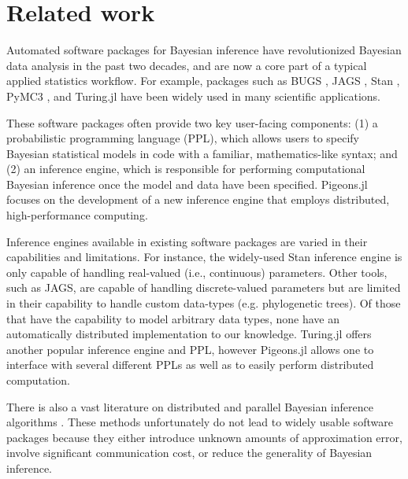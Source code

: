 \section{Related work}
Automated software packages for Bayesian inference have revolutionized Bayesian data 
analysis in the past two decades, and are now a core part of a typical applied statistics 
workflow. For example, packages such as BUGS 
\cite{lunn2013bugs, lunn2009bugs, lunn2000winbugs}, 
JAGS \cite{hornik2003jags}, Stan \cite{carpenter2017stan}, PyMC3 
\cite{salvatier2016probabilistic}, and Turing.jl \cite{ge2018turing} have been widely used in 
many scientific applications.

\medskip 
These software packages often provide two key user-facing components: (1) a 
probabilistic programming language (PPL), which allows users to specify Bayesian 
statistical models in code with a familiar, mathematics-like syntax; and (2) an 
inference engine, which is responsible for performing computational Bayesian
inference once the model and data have been specified. 
Pigeons.jl focuses on the development 
of a new inference engine that employs distributed, high-performance computing.

\medskip
Inference engines available in existing software packages are varied in their 
capabilities and limitations. For instance, the widely-used Stan inference engine 
is only capable of handling real-valued (i.e., continuous) parameters. 
Other tools, such as JAGS, are capable of handling discrete-valued parameters but 
are limited in their capability to handle custom data-types 
(e.g. phylogenetic trees). 
Of those that have the capability to model arbitrary data types, 
none have an automatically distributed implementation to our knowledge.
Turing.jl \cite{ge2018turing} offers another popular inference engine and PPL, 
however Pigeons.jl allows one to interface with several different PPLs as well as 
to easily perform distributed computation.

\medskip
There is also a vast literature on distributed and parallel 
Bayesian inference algorithms 
\cite{bardenet2017markov, brockwell2006parallel, calderhead2014general,
jacob2020unbiased, jacob2011using, lee2010utility, scott2016bayes, 
wang2015parallelizing, wu2017average, zhu2017big}.
These methods unfortunately do not lead to widely 
usable software packages because they either introduce unknown amounts of 
approximation error, involve significant communication cost, or reduce the 
generality of Bayesian inference. 
